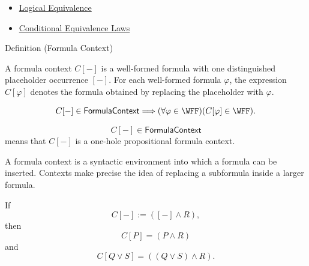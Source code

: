 \begin{dependencies}
\begin{itemize}
  \item \hyperref[def:logical-equivalence-propositional-logic]{Logical Equivalence}
  \item \hyperref[thm:conditional-equivalence-laws-propositional-logic]{Conditional Equivalence Laws}
\end{itemize}
\end{dependencies}
\begin{definitionbox}{Definition (Formula Context)}
\begin{definition}
\label{def:formula-context-propositional-logic}
A formula context \(C[-]\) is a well-formed formula with one distinguished placeholder occurrence \([-]\). For each well-formed formula \(\varphi\), the expression \(C[\varphi]\) denotes the formula obtained by replacing the placeholder with \(\varphi\).
\end{definition}
\end{definitionbox}

\begin{remark*}
\[
C[-]\in\mathsf{FormulaContext}
\Longrightarrow
(\forall\varphi\in\WFF)(C[\varphi]\in\WFF).
\]
\end{remark*}

\begin{remark*}
\[
C[-]\in\mathsf{FormulaContext}
\]
means that \(C[-]\) is a one-hole propositional formula context.
\end{remark*}

\begin{remark*}[Interpretation]
A formula context is a syntactic environment into which a formula can be inserted. Contexts make precise the idea of replacing a subformula inside a larger formula.
\end{remark*}

\begin{remark*}[Examples]
If
\[
C[-] := ([-]\land R),
\]
then
\[
C[P]=(P\land R)
\]
and
\[
C[Q\lor S]=((Q\lor S)\land R).
\]
\end{remark*}

